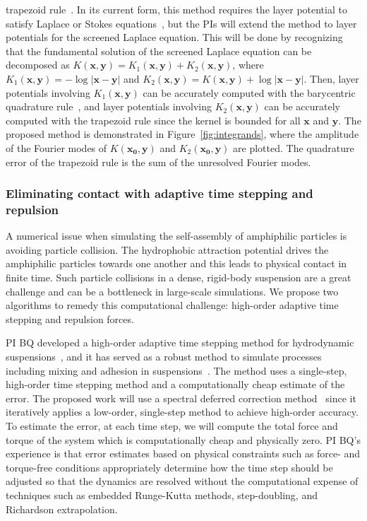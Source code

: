 trapezoid rule~\cite{ioa-pap-per1991}. In its current form, this method
requires the layer potential to satisfy Laplace or Stokes
equations~\cite{bar-wu-vee2015, chi-moo-qua2020}, but the PIs will
extend the method to layer potentials for the screened Laplace equation.
This will be done by recognizing that the fundamental solution of the
screened Laplace equation can be decomposed as $K(\mathbf{x},\mathbf{y})
= K_1(\mathbf{x},\mathbf{y}) + K_2(\mathbf{x},\mathbf{y})$, where
$K_1(\mathbf{x},\mathbf{y}) = -\log|\mathbf{x} - \mathbf{y}|$ and
$K_2(\mathbf{x},\mathbf{y}) = K(\mathbf{x},\mathbf{y}) + \log|\mathbf{x}
- \mathbf{y}|$. Then, layer potentials involving
$K_1(\mathbf{x},\mathbf{y})$ can be accurately computed with the
barycentric quadrature rule~\cite{ioa-pap-per1991}, and layer potentials
involving $K_2(\mathbf{x},\mathbf{y})$ can be accurately computed with
the trapezoid rule since the kernel is bounded for all $\mathbf{x}$ and
$\mathbf{y}$. The proposed method is demonstrated in
Figure~\ref{fig:integrands}, where the amplitude of the Fourier modes of
$K(\mathbf{x_0},\mathbf{y})$ and $K_2(\mathbf{x_0},\mathbf{y})$ are
plotted. The quadrature error of the trapezoid rule is the sum of the
unresolved Fourier modes.


\subsubsection{Eliminating contact with adaptive time stepping and
repulsion}
\label{subsec:timeStepping}

A numerical issue when simulating the self-assembly of amphiphilic
particles is avoiding particle collision. The hydrophobic attraction
potential drives the amphiphilic particles towards one another and
this leads to physical contact in
finite time. Such particle collisions in a dense, rigid-body suspension
are a great challenge and can be a bottleneck in large-scale simulations.
We propose two algorithms to remedy this computational challenge:
high-order adaptive time stepping and repulsion forces.

PI BQ developed a high-order adaptive time stepping method for
hydrodynamic suspensions~\cite{qua-bir2016}, and it has served as a
robust method to simulate processes including mixing and adhesion in
suspensions~\cite{qua-vee-you2019, kab-qua-bir2017}. The method uses
a single-step, high-order time stepping method and a computationally
cheap estimate of the error. The proposed work will use a spectral
deferred correction method~\cite{dut-gre-rok2000} since it iteratively
applies a low-order, single-step method to achieve high-order accuracy.
To estimate the error, at each time step, we will compute the total force
and torque of the system which is computationally cheap and physically
zero. PI BQ's experience is that error estimates based on physical
constraints such as force- and torque-free conditions appropriately
determine how the time step should be adjusted so that the dynamics are
resolved without the computational expense of techniques such as
embedded Runge-Kutta methods, step-doubling, and Richardson
extrapolation.

